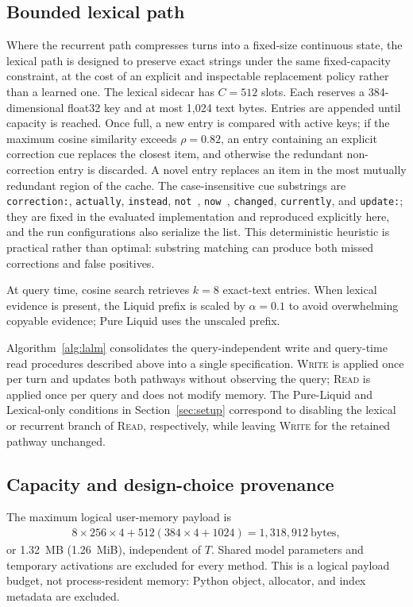 \documentclass[conference]{IEEEtran}
\begin{document}
\subsection{Bounded lexical path}
\label{sec:lexical}
Where the recurrent path compresses turns into a fixed-size continuous state, the lexical path is designed to preserve exact strings under the same fixed-capacity constraint, at the cost of an explicit and inspectable replacement policy rather than a learned one. The lexical sidecar has $C=512$ slots. Each reserves a 384-dimensional float32 key and at most 1,024 text bytes. Entries are appended until capacity is reached. Once full, a new entry is compared with active keys; if the maximum cosine similarity exceeds $\rho=0.82$, an entry containing an explicit correction cue replaces the closest item, and otherwise the redundant non-correction entry is discarded. A novel entry replaces an item in the most mutually redundant region of the cache. The case-insensitive cue substrings are
\texttt{correction:}, \texttt{actually}, \texttt{instead}, \texttt{not },
\texttt{now }, \texttt{changed}, \texttt{currently}, and \texttt{update:};
they are fixed in the evaluated implementation and reproduced explicitly here, and the run configurations also serialize the list. This deterministic heuristic is practical rather than optimal: substring matching can produce both missed corrections and false positives.

At query time, cosine search retrieves $k=8$ exact-text entries. When lexical evidence is present, the Liquid prefix is scaled by $\alpha=0.1$ to avoid overwhelming copyable evidence; Pure Liquid uses the unscaled prefix.

Algorithm~\ref{alg:lalm} consolidates the query-independent write and query-time read procedures described above into a single specification. \textsc{Write} is applied once per turn and updates both pathways without observing the query; \textsc{Read} is applied once per query and does not modify memory. The Pure-Liquid and Lexical-only conditions in Section~\ref{sec:setup} correspond to disabling the lexical or recurrent branch of \textsc{Read}, respectively, while leaving \textsc{Write} for the retained pathway unchanged.


\subsection{Capacity and design-choice provenance}
\label{sec:capacity}
The maximum logical user-memory payload is
\begin{align}
8\!\times\!256\!\times\!4+
512(384\!\times\!4+1024)=1{,}318{,}912\ \text{bytes},
\end{align}
or 1.32~MB (1.26~MiB), independent of $T$. Shared model parameters and temporary activations are excluded for every method. This is a logical payload budget, not process-resident memory: Python object, allocator, and index metadata are excluded.
\end{document}
